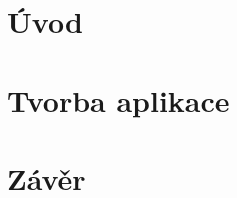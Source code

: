 \documentclass[czech,maturita,a4paper]{diploma}
\begin{document}
\MakeTitlePages
\chapter{Úvod}





\chapter{Tvorba aplikace}





\chapter{Závěr}

\printbibliography[title={Literatura}]

\end{document}
